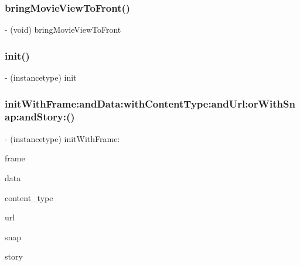 \subsubsection{\texorpdfstring{bring\+Movie\+View\+To\+Front()}{bringMovieViewToFront()}}
{\footnotesize\ttfamily -\/ (void) bring\+Movie\+View\+To\+Front \begin{DoxyParamCaption}{ }\end{DoxyParamCaption}}

\hypertarget{interface_content_displayer_a8609eb22a891ebc39b25b6ccd4b9cb00}{}\label{interface_content_displayer_a8609eb22a891ebc39b25b6ccd4b9cb00} 
\subsubsection{\texorpdfstring{init()}{init()}}
{\footnotesize\ttfamily -\/ (instancetype) init \begin{DoxyParamCaption}{ }\end{DoxyParamCaption}}

\hypertarget{interface_content_displayer_aae262893d4c6e7ff993ff480a93186e2}{}\label{interface_content_displayer_aae262893d4c6e7ff993ff480a93186e2} 
\subsubsection{\texorpdfstring{init\+With\+Frame\+:and\+Data\+:with\+Content\+Type\+:and\+Url\+:or\+With\+Snap\+:and\+Story\+:()}{initWithFrame:andData:withContentType:andUrl:orWithSnap:andStory:()}}
{\footnotesize\ttfamily -\/ (instancetype) init\+With\+Frame\+: \begin{DoxyParamCaption}\item[{(C\+G\+Rect)}]{frame }\item[{andData:(N\+S\+Data $\ast$)}]{data }\item[{withContentType:(int)}]{content\+\_\+type }\item[{andUrl:(N\+S\+U\+RL $\ast$)}]{url }\item[{orWithSnap:(\hyperlink{interface_snap}{Snap} $\ast$)}]{snap }\item[{andStory:(\hyperlink{interface_story}{Story} $\ast$)}]{story }\end{DoxyParamCaption}}

